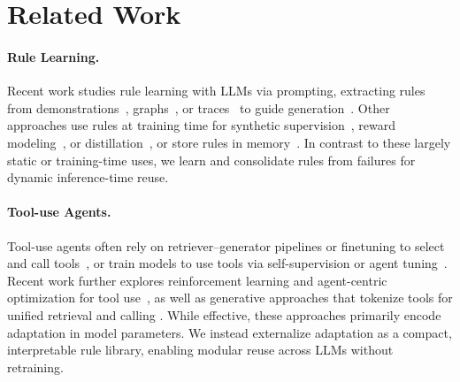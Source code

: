 \section{Related Work}

\paragraph{Rule Learning.}
Recent work studies rule learning with LLMs via prompting, extracting rules from
demonstrations~\cite{gao2024customizing}, graphs~\cite{chen2024rulerag}, or traces~\cite{zhang2024ruag}
to guide generation~\cite{zhou2024self,wang2024ulogic}. Other approaches use rules at training
time for synthetic supervision~\cite{morishita2024enhancing}, reward modeling~\cite{wang2025autorule},
or distillation~\cite{sadeq2025improving}, or store rules in memory~\cite{wang2024symbolic}. In
contrast to these largely static or training-time uses, we learn and consolidate rules from
failures for dynamic inference-time reuse.


\paragraph{Tool-use Agents.}
Tool-use agents often rely on retriever--generator pipelines or finetuning to select and call
tools~\citep{qin2023toolllm,patil2023gorilla}, or train models to use tools via self-supervision
or agent tuning~\citep{schick2023toolformer}. Recent work further explores reinforcement
learning and agent-centric optimization for tool use~\citep{le2025toolbrain,zhang2025toolr1},
as well as generative approaches that tokenize tools for unified retrieval and calling
\citep{hao2023toolkengpt,wang2024toolgen}. While effective, these approaches primarily encode
adaptation in model parameters. We instead externalize adaptation as a compact, interpretable
rule library, enabling modular reuse across LLMs without retraining.
